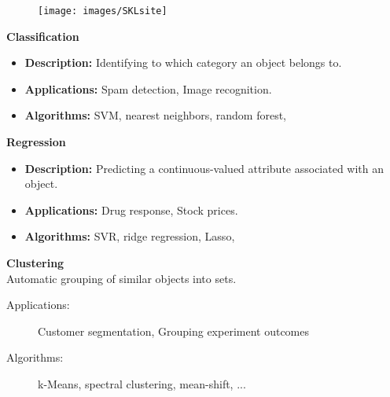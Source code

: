 \documentclass[MASTER.tex]{subfiles}
\begin{document}
\begin{frame}
	\begin{figure}
\centering
\texttt{[image: images/SKLsite]}

\end{figure}

\end{frame}
\begin{frame}
	\LARGE
\textbf{Classification}
\begin{itemize}
\item \textbf{Description:} Identifying to which category an object belongs to.
\item \textbf{Applications:} Spam detection, Image recognition.
\item \textbf{Algorithms:} SVM, nearest neighbors, random forest, 
\end{itemize}

\end{frame}
\begin{frame}
\LARGE
\textbf{Regression}
\begin{itemize}
\item \textbf{Description:} Predicting a continuous-valued attribute associated with an object.
\item \textbf{Applications:} Drug response, Stock prices.
\item \textbf{Algorithms:} SVR, ridge regression, Lasso, 

\end{itemize}

\end{frame}
\begin{frame}
	\LARGE
\textbf{Clustering}\\

Automatic grouping of similar objects into sets.
\begin{description}
\item[Applications:] Customer segmentation, Grouping experiment outcomes
\item[Algorithms:] k-Means, spectral clustering, mean-shift, ...
\end{description}
\end{frame}
\end{document}
